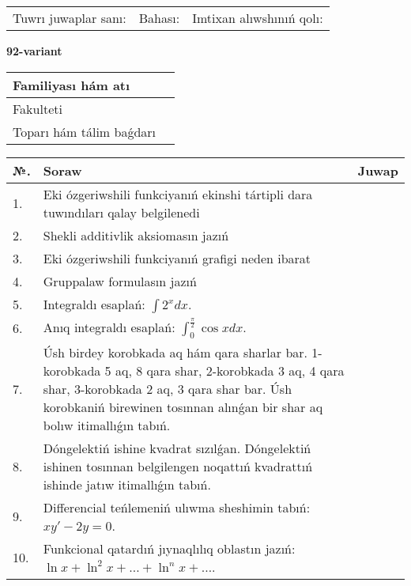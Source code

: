 \documentclass{article}
\begin{document}
\vspace{1cm}

\begin{tabular}{ c c c }
Tuwrı juwaplar sanı: \underline{\hspace{2cm}} & Bahası: \underline{\hspace{2cm}} & Imtixan alıwshınıń qolı: \underline{\hspace{2cm}} \\
\end{tabular}

\newpage

\begin{center}\textbf{92-variant}\end{center}

\bgroup
\def\arraystretch{1.5}
\begin{tabular}{ |m{6cm}|m{10cm}| }
  \hline
  Familiyası hám atı & \\
  \hline
  Fakulteti &\\
  \hline
  Toparı hám tálim baǵdarı & \\
  \hline
\end{tabular}
\egroup

\vspace{0.5cm}

\bgroup
\def\arraystretch{2}
\begin{tabular}{ |l|m{8cm}|m{7cm}| }
  \hline
  №. & Soraw & Juwap \\
  \hline
  1. & Eki ózgeriwshili funkciyanıń ekinshi tártipli dara tuwındıları qalay belgilenedi &  \\
  \hline
  2. & Shekli additivlik aksiomasın jazıń &  \\
  \hline
  3. & Eki ózgeriwshili funkciyanıń grafigi neden ibarat &  \\
  \hline
  4. & Gruppalaw formulasın jazıń &  \\
  \hline
  5. & Integraldı esaplań: $\displaystyle\int {2^{x}dx} $. &  \\
  \hline
  6. & Anıq integraldı esaplań: $\displaystyle\int_{0}^{\frac{\pi}{2}}\cos xdx$. &  \\
  \hline
  7. & Úsh birdey korobkada aq hám qara sharlar bar. 1-korobkada 5 aq, 8 qara shar, 2-korobkada 3 aq, 4 qara shar, 3-korobkada 2 aq, 3 qara shar bar. Úsh korobkaniń birewinen tosınnan alınǵan bir shar aq bolıw itimallıǵın tabıń. &  \\
  \hline
  8. & Dóngelektiń ishine kvadrat sızılǵan. Dóngelektiń ishinen tosınnan belgilengen noqattıń kvadrattıń ishinde jatıw itimallıǵın tabıń. &  \\
  \hline
  9. & Differencial teńlemeniń ulıwma sheshimin tabıń: $xy' - 2y = 0$. &  \\
  \hline
  10. & Funkcional qatardıń jıynaqlılıq oblastın jazıń: $\ln x + \ln^{2}x + \ldots + \ln^{n}x + \ldots$. &  \\
  \hline
\end{tabular}
\egroup
\end{document}

